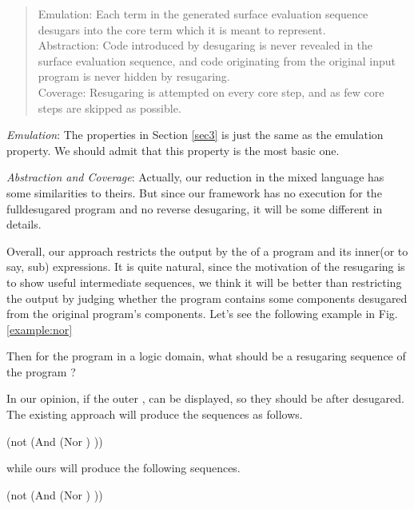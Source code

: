 \begin{quote}
Emulation: 
Each term in the generated surface evaluation sequence desugars into the core term which it is meant to represent.\\
Abstraction: 
Code introduced by desugaring is never revealed in the surface evaluation sequence, and code originating from the original input program is never hidden by resugaring.\\
Coverage: Resugaring is attempted on every core step, and as few core steps are skipped as possible.\\
\end{quote}

\emph{Emulation}: The properties in Section \ref{sec3} is just the same as the emulation property. We should admit that this property is the most basic one.

\emph{Abstraction and Coverage}: Actually, our reduction in the mixed language has some similarities to theirs. But since our framework has no execution for the fulldesugared program and no reverse desugaring, it will be some different in details.

Overall, our approach restricts the output by the  of a program and its inner(or to say, sub) expressions. It is quite natural, since the motivation of the resugaring is to show useful intermediate sequences, we think it will be better than restricting the output by judging whether the program contains some components desugared from the original program's components. Let's see the following example in Fig.  \ref{example:nor}

Then for the program in a logic domain, what should be a resugaring sequence of the program  ?

In our opinion, if the outer ,  can be displayed, so they should be after desugared.
The existing approach will produce the sequences as follows.
\begin{footnotesize}
\begin{Codes}
    (not (And (Nor \false \true) \true))
\OneStep{ \true}
\end{Codes}
\end{footnotesize}

while ours will produce the following sequences.
\begin{footnotesize}
\begin{Codes}
    (not (And (Nor \false \true) \true))
\OneStep{ \true}
\end{Codes}
\end{footnotesize}



